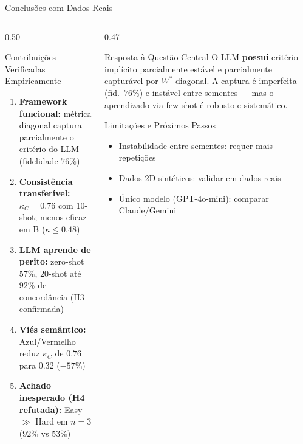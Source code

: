 \documentclass[aspectratio=169, 8pt]{beamer}
\begin{document}
\begin{frame}{Conclusões com Dados Reais}
  \begin{columns}[T]
    \begin{column}{0.50\textwidth}
      \begin{block}{Contribuições Verificadas Empiricamente}
        \scriptsize
        \begin{enumerate}
          \item \textbf{Framework funcional:} métrica diagonal captura
            parcialmente o critério do LLM (fidelidade $76\%$)
          \item \textbf{Consistência transferível:} $\kappa_C=0.76$ com 10-shot;
            menos eficaz em B ($\kappa \leq 0.48$)
          \item \textbf{LLM aprende de perito:} zero-shot $57\%$, 20-shot
            até $92\%$ de concordância (H3 confirmada)
          \item \textbf{Viés semântico:} Azul/Vermelho reduz $\kappa_C$
            de $0.76$ para $0.32$ ($-57\%$)
          \item \textbf{Achado inesperado (H4 refutada):} Easy $\gg$ Hard em
            $n=3$ ($92\%$ vs $53\%$)
        \end{enumerate}
      \end{block}
    \end{column}

    \begin{column}{0.47\textwidth}
      \begin{exampleblock}{Resposta à Questão Central}
        \footnotesize
        O LLM \textbf{possui} critério implícito parcialmente estável
        e parcialmente capturável por $W^*$ diagonal.
        A captura é imperfeita (fid.\ $76\%$) e instável
        entre sementes --- mas o aprendizado via few-shot
        é robusto e sistemático.
      \end{exampleblock}

      \vspace{0.3em}

      \begin{alertblock}{Limitações e Próximos Passos}
        \footnotesize
        \begin{itemize}
          \item Instabilidade entre sementes: requer mais repetições
          \item Dados 2D sintéticos: validar em dados reais
          \item Único modelo (GPT-4o-mini): comparar Claude/Gemini
        \end{itemize}
      \end{alertblock}
    \end{column}
  \end{columns}
\end{frame}
\end{document}
